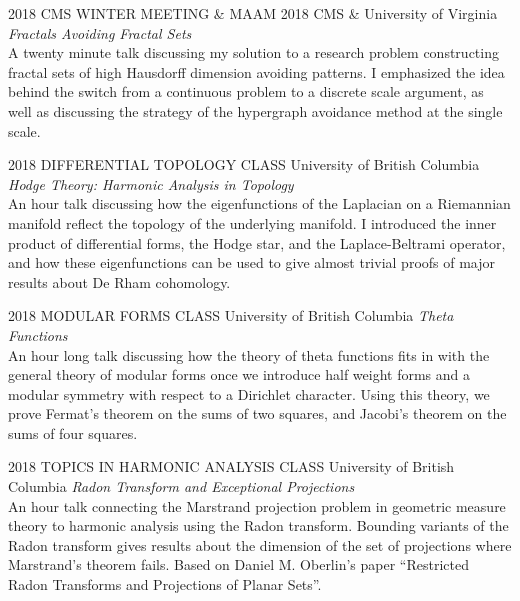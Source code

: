 \documentclass{friggeri-cv}
\begin{document}
\begin{entrylist}


\entry
{2018}
{CMS WINTER MEETING \& MAAM 2018}
{CMS \& University of Virginia}
{\emph{Fractals Avoiding Fractal Sets}\\
    A twenty minute talk discussing my solution to a research problem constructing fractal sets of high Hausdorff dimension avoiding patterns. I emphasized the idea behind the switch from a continuous problem to a discrete scale argument, as well as discussing the strategy of the hypergraph avoidance method at the single scale.
}


\entry
{2018}
{DIFFERENTIAL TOPOLOGY CLASS}
{University of British Columbia}
{\emph{Hodge Theory: Harmonic Analysis in Topology}\\
    An hour talk discussing how the eigenfunctions of the Laplacian on a Riemannian manifold reflect the topology of the underlying manifold. I introduced the inner product of differential forms, the Hodge star, and the Laplace-Beltrami operator, and how these eigenfunctions can be used to give almost trivial proofs of major results about De Rham cohomology.
}


\entry
{2018}
{MODULAR FORMS CLASS}
{University of British Columbia}
{\emph{Theta Functions}\\
    An hour long talk discussing how the theory of theta functions fits in with the general theory of modular forms once we introduce half weight forms and a modular symmetry with respect to a Dirichlet character. Using this theory, we prove Fermat's theorem on the sums of two squares, and Jacobi's theorem on the sums of four squares.
}


\entry
{2018}
{TOPICS IN HARMONIC ANALYSIS CLASS}
{University of British Columbia}
{\emph{Radon Transform and Exceptional Projections}\\
    An hour talk connecting the Marstrand projection problem in geometric measure theory to harmonic analysis using the Radon transform. Bounding variants of the Radon transform gives results about the dimension of the set of projections where Marstrand's theorem fails. Based on Daniel M. Oberlin's paper ``Restricted Radon Transforms and Projections of Planar Sets''.
} 

\end{entrylist}
\end{document}
